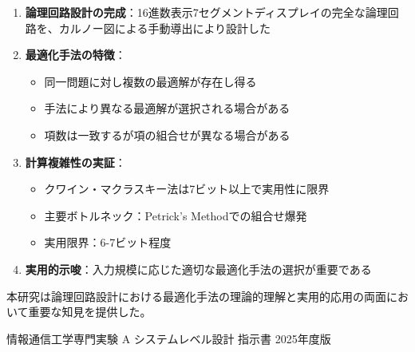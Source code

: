 \documentclass[a4j,dvipdfmx]{jsarticle}
\begin{document}
\begin{enumerate}
\item \textbf{論理回路設計の完成}：16進数表示7セグメントディスプレイの完全な論理回路を、カルノー図による手動導出により設計した

\item \textbf{最適化手法の特徴}：
\begin{itemize}
\item 同一問題に対し複数の最適解が存在し得る
\item 手法により異なる最適解が選択される場合がある
\item 項数は一致するが項の組合せが異なる場合がある
\end{itemize}

\item \textbf{計算複雑性の実証}：
\begin{itemize}
\item クワイン・マクラスキー法は7ビット以上で実用性に限界
\item 主要ボトルネック：Petrick's Methodでの組合せ爆発
\item 実用限界：6-7ビット程度
\end{itemize}

\item \textbf{実用的示唆}：入力規模に応じた適切な最適化手法の選択が重要である
\end{enumerate}

本研究は論理回路設計における最適化手法の理論的理解と実用的応用の両面において重要な知見を提供した。

\begin{thebibliography}{9}
 情報通信工学専門実験 A システムレベル設計 指示書 2025年度版
\end{thebibliography}
\end{document}

